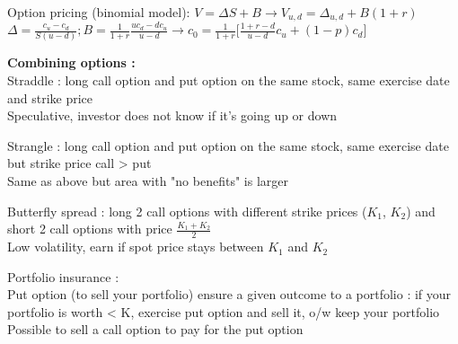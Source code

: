 \documentclass[a4paper,twocolumn]{article}
\begin{document}
Option pricing (binomial model): $V=\Delta S +B \rightarrow V_{u,d} = \Delta_{u, d} + B(1+r)$ \\
$\Delta = \frac{c_u - c_d}{S(u-d)} ; B= \frac{1}{1+r} \frac{u c_d - d c_u}{u-d} \rightarrow c_0 = \frac{1}{1+r} \big[ \frac{1+r-d}{u-d}c_u + (1-p)c_d \big]$

\textbf{Combining options :}\\
Straddle : long call option and put option on the same stock, same exercise date and strike price\\
Speculative, investor does not know if it's going up or down

Strangle : long call option and put option on the same stock, same exercise date but strike price call > put\\
Same as above but area with "no benefits" is larger

Butterfly spread : long 2 call options with different strike prices ($K_1$, $K_2$) and short 2 call options with price $\frac{K_1 + K_2}{2}$\\
Low volatility, earn if spot price stays between $K_1$ and $K_2$

Portfolio insurance :\\
Put option (to sell your portfolio) ensure a given outcome to a portfolio : if your portfolio is worth < K, exercise put option and sell it, o/w keep your portfolio\\
Possible to sell a call option to pay for the put option
\end{document}
